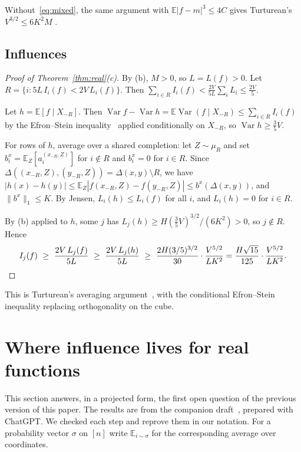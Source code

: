 \documentclass[11pt]{article}
\numberwithin{equation}{section}
\theoremstyle{definition}
\theoremstyle{remark}
\newcommand{\E}{\mathbb{E}}
\newcommand{\1}{\mathbf 1}
\newcommand{\Var}{\operatorname{Var}}
\newcommand{\nrm}[1]{\lVert #1\rVert_1}
\begin{document}
Without~\eqref{eq:mixed}, the same argument with $\E|f-m|^3\le4C$ gives Turturean's $V^{3/2}\le6K^2M$ \cite[Theorem~7.10]{Tur26}.

\subsection{Influences}
\begin{proof}[Proof of Theorem~\ref{thm:real}(c)]
By (b), $M>0$, so $L=L(f)>0$. Let $R=\{i:5L\,I_i(f)<2V\,L_i(f)\}$. Then $\sum_{i\in R}I_i(f)<\frac{2V}{5L}\sum_iL_i\le\frac{2V}5$.

Let $h=\E[f\mid X_{-R}]$. Then $\Var f-\Var h=\E\Var(f\mid X_{-R})\le\sum_{i\in R}I_i(f)$ by the Efron--Stein inequality~\cite{ES81} applied conditionally on $X_{-R}$, so $\Var h\ge\frac35V$.

For rows of $h$, average over a shared completion: let $Z\sim\mu_R$ and set $b^x_i=\E_Z[a^{(x_{-R},Z)}_i]$ for $i\notin R$ and $b^x_i=0$ for $i\in R$. Since $\Delta((x_{-R},Z),(y_{-R},Z))=\Delta(x,y)\setminus R$, we have $|h(x)-h(y)|\le\E_Z|f(x_{-R},Z)-f(y_{-R},Z)|\le b^x(\Delta(x,y))$, and $\nrm{b^x}\le K$. By Jensen, $L_i(h)\le L_i(f)$ for all $i$, and $L_i(h)=0$ for $i\in R$.

By (b) applied to $h$, some $j$ has $L_j(h)\ge H(\frac35V)^{3/2}/(6K^2)>0$, so $j\notin R$. Hence
\[
I_j(f)\ \ge\ \frac{2V\,L_j(f)}{5L}\ \ge\ \frac{2V\,L_j(h)}{5L}\ \ge\ \frac{2H(3/5)^{3/2}}{30}\cdot\frac{V^{5/2}}{LK^2}=\frac{H\sqrt{15}}{125}\cdot\frac{V^{5/2}}{LK^2}.\qedhere
\]
\end{proof}

This is Turturean's averaging argument~\cite[Theorem~8.3]{Tur26}, with the conditional Efron--Stein inequality replacing orthogonality on the cube.

\section{Where influence lives for real functions}\label{sec:wil}

This section answers, in a projected form, the first open question of the previous version of this paper. The results are from the companion draft~\cite{WriWIL}, prepared with ChatGPT. We checked each step and reprove them in our notation. For a probability vector $\sigma$ on $[n]$ write $\E_{i\sim\sigma}$ for the corresponding average over coordinates.
\end{document}
